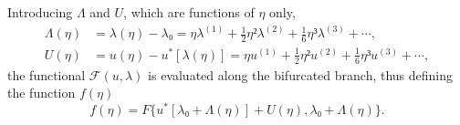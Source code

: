 \documentclass[12pt, final]{scrartcl}
\theoremstyle{definition}
\newcommand{\order}[2][1]{#2^{(#1)}}
\begin{document}
Introducing $\Lambda$ and $U$, which are functions of $η$ only,
\begin{align}
  \label{eq:20211112155446}
  \Lambda(η) & = \lambda(η) - \lambda₀ = η \order[1]\lambda + \tfrac{1}{2} η² \order[2]\lambda + \tfrac{1}{6} η³ \order[3]\lambda + \cdots,\\
  \label{eq:20211112113028}
  U(η) & = u(η) - u^{\ast}[\lambda(η)] = η \order[1]u + \tfrac{1}{2} η² \order[2]u + \tfrac{1}{6} η³ \order[3]u + \cdots,
\end{align}
the functional $\mathcal{F}(u, \lambda)$ is evaluated along the bifurcated branch,
thus defining the function $f(η)$
\begin{equation*}
  f(η) = F\{ u^{\ast} [\lambda₀ + \Lambda(η)] + U(η), \lambda₀ + \Lambda(η) \}.
\end{equation*}
\end{document}
